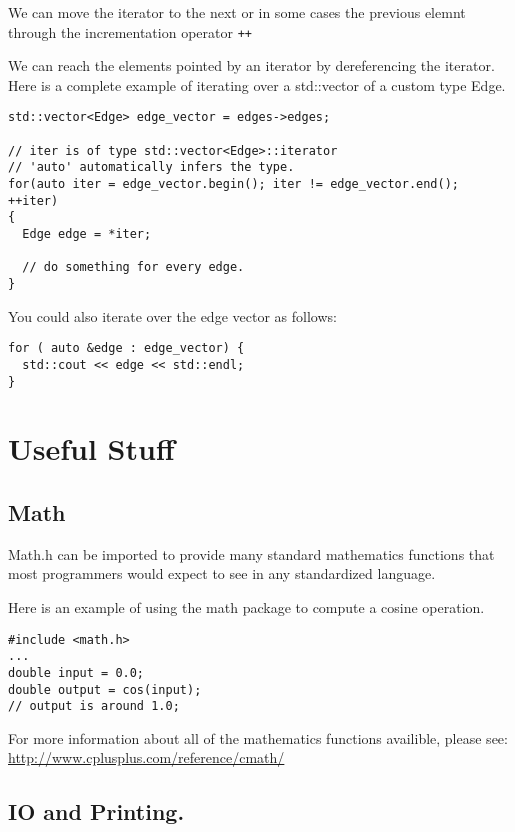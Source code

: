 \documentclass[12pt, letterpaper]{article}
\begin{document}
We can move the iterator to the next or in some cases the previous elemnt through the incrementation operator \texttt{++}

We can reach the elements pointed by an iterator by dereferencing the iterator.\\

Here is a complete example of iterating over a std::vector of a custom type Edge.

\begin{verbatim}
std::vector<Edge> edge_vector = edges->edges;

// iter is of type std::vector<Edge>::iterator
// 'auto' automatically infers the type.
for(auto iter = edge_vector.begin(); iter != edge_vector.end(); ++iter)
{
  Edge edge = *iter;

  // do something for every edge.
}
\end{verbatim}

You could also iterate over the edge vector as follows:

\begin{verbatim}
for ( auto &edge : edge_vector) {
  std::cout << edge << std::endl;
}
\end{verbatim}

\newpage
\section{Useful Stuff}

\subsection{Math}

Math.h can be imported to provide many standard mathematics functions that most programmers would expect to see in any standardized language.

Here is an example of using the math package to compute a cosine operation.

\begin{verbatim}
#include <math.h>
...
double input = 0.0;
double output = cos(input);
// output is around 1.0;
\end{verbatim}

For more information about all of the mathematics functions availible, please see: \\
\href{http://www.cplusplus.com/reference/cmath/}{http://www.cplusplus.com/reference/cmath/}



\subsection{IO and Printing.} \label{printing}
\end{document}
